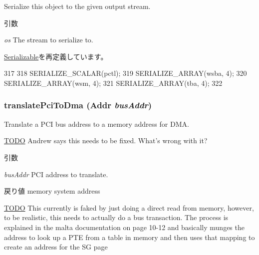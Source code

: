 \label{classMaltaPChip_a53e036786d17361be4c7320d39c99b84}
Serialize this object to the given output stream. 
\begin{DoxyParams}{引数}
\item[{\em os}]The stream to serialize to. \end{DoxyParams}


\hyperlink{classSerializable_ad6272f80ae37e8331e3969b3f072a801}{Serializable}を再定義しています。


\begin{DoxyCode}
317 {
318     SERIALIZE_SCALAR(pctl);
319     SERIALIZE_ARRAY(wsba, 4);
320     SERIALIZE_ARRAY(wsm, 4);
321     SERIALIZE_ARRAY(tba, 4);
322 }
\end{DoxyCode}
\hypertarget{classMaltaPChip_a5de3f8c8c47bf4bb58e072f54f4a7cba}{
\subsubsection[{translatePciToDma}]{ translatePciToDma ({\bf Addr} {\em busAddr})}}
\label{classMaltaPChip_a5de3f8c8c47bf4bb58e072f54f4a7cba}
Translate a PCI bus address to a memory address for DMA. \begin{Desc}
\item[\hyperlink{todo__todo000065}{TODO}]Andrew says this needs to be fixed. What's wrong with it? \end{Desc}

\begin{DoxyParams}{引数}
\item[{\em busAddr}]PCI address to translate. \end{DoxyParams}
\begin{DoxyReturn}{戻り値}
memory system address 
\end{DoxyReturn}


\begin{Desc}
\item[\hyperlink{todo__todo000064}{TODO}]This currently is faked by just doing a direct read from memory, however, to be realistic, this needs to actually do a bus transaction. The process is explained in the malta documentation on page 10-\/12 and basically munges the address to look up a PTE from a table in memory and then uses that mapping to create an address for the SG page \end{Desc}



